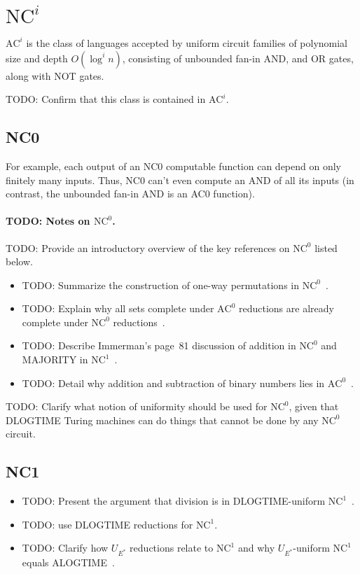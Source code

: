 \section{\texorpdfstring{$\text{NC}^i$}{NC\string^i}}
$\text{AC}^i$ is the class of languages accepted by uniform circuit
families of polynomial size and depth $O(\log^i n)$, consisting of unbounded fan-in
AND, and OR gates, along with NOT gates.

TODO: Confirm that this class is contained in $\text{AC}^i$.

\subsection{NC0}
For example, each output of an NC0 computable function can depend on only finitely many
inputs. Thus, NC0 can't even compute an AND of all its inputs (in contrast, the unbounded
fan-in AND is an AC0 function).
\paragraph{TODO: Notes on $\text{NC}^0$.}
TODO: Provide an introductory overview of the key references on $\text{NC}^0$ listed below.
\begin{itemize}
\item TODO: Summarize the construction of one-way permutations in $\text{NC}^0$~\cite{10.1016/0020-01908790053-6}.
\item TODO: Explain why all sets complete under $\text{AC}^0$ reductions are already complete under $\text{NC}^0$ reductions~\cite{10.1145/258533.258671,AGRAWAL1998127}.
\item TODO: Describe Immerman's page~81 discussion of addition in $\text{NC}^0$ and MAJORITY in $\text{NC}^1$~\cite{Immerman1999-IMMDC}.
\item TODO: Detail why addition and subtraction of binary numbers lies in $\text{AC}^0$~\cite{27676}.
\end{itemize}


TODO: Clarify what notion of uniformity should be used for $\text{NC}^0$, given that DLOGTIME Turing machines can do things that cannot be done by
any $\text{NC}^0$ circuit.
\subsection{NC1}
\begin{itemize}
\item TODO: Present the argument that division is in DLOGTIME-uniform $\text{NC}^1$~\cite{ITA_2001__35_3_259_0}.
\item TODO: use DLOGTIME reductions for $\text{NC}^1$.
\item TODO: Clarify how $U_{E^*}$ reductions relate to $\text{NC}^1$ and why $U_{E^*}$-uniform $\text{NC}^1$ equals ALOGTIME~\cite{RUZZO1981365}.
\end{itemize}



